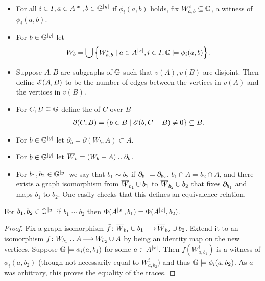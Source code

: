 \begin{Definition} \label{def_e}\ 
  \begin{itemize}
  \item For all $i \in I, a \in A^{|x|}, b \in \mathbb G^{|y|}$ if $\phi_i(a, b)$ holds, fix $W^i_{a,b} \subseteq \mathbb G$, a witness of $\phi_i(a, b)$.
  \item For $b \in \mathbb G^{|y|}$ let 
    \begin{align*}
      W_b = \bigcup \left\{W^i_{a,b} \mid a \in A^{|x|}, i \in I, \mathbb G \models \phi_i(a,b)\right\}.
    \end{align*}
  \item Suppose $A, B$ are subgraphs of $\mathbb G$ such that $v(A), v(B)$ are disjoint.
    Then define $\mathscr E(A, B)$ to be the number of edges between the vertices in $v(A)$ and the vertices in $v(B)$.
  \item For $C, B \subseteq \mathbb G$ define the \defn{boundary} of $C$ over $B$
    \begin{align*}
      \partial(C, B) = \left\{b \in B \mid \mathscr E(b, C - B) \neq 0\right\} \subseteq B.
    \end{align*}
  \item For $b \in \mathbb G^{|y|}$ let $\partial_b = \partial(W_b, A) \subset A$.
  \item For $b \in \mathbb G^{|y|}$ let ${\overline{W}}_b = (W_b - A) \cup \partial_b$.
  \item For $b_1, b_2 \in \mathbb G^{|y|}$ we say that $b_1 \sim b_2$ if $\partial_{b_1} = \partial_{b_2}$,
    $b_1 \cap A = b_2 \cap A$,
    and there exists a graph isomorphism from ${\overline{W}}_{b_1} \cup b_1$ to ${\overline{W}}_{b_2} \cup b_2$
    that fixes $\partial_{b_1}$ and
    maps $b_1$ to $b_2$.
    One easily checks that this defines an equivalence relation.
  \end{itemize}
\end{Definition}

\begin{Lemma} \label {bound_trace}
  For $b_1, b_2 \in \mathbb G^{|y|}$ if $b_1 \sim b_2$ then $\Phi(A^{|x|}, b_1) = \Phi(A^{|x|}, b_2)$.
\end{Lemma}

\begin{proof}
  Fix a graph isomorphism $\bar f \colon {\overline{W}}_{b_1} \cup b_1 \operatorname{\longrightarrow} {\overline{W}}_{b_2} \cup b_2$.
  Extend it to an isomorphism $f \colon W_{b_1} \cup A \operatorname{\longrightarrow} W_{b_2} \cup A$ by being an identity map on the new vertices.
  Suppose $\mathbb G \models \phi_i(a, b_1)$ for some $a \in A^{|x|}$.
  Then $f(W^i_{a, b_1})$ is a witness of $\phi_i(a, b_2)$ (though not necessarily equal to $W^i_{a, b_2}$)
  and thus $\mathbb G \models \phi_i(a, b_2)$.
  As $a$ was arbitrary, this proves the equality of the traces.
\end{proof}


